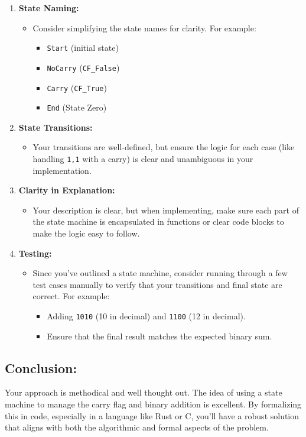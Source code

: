 \documentclass{article}
\begin{document}
\begin{enumerate}
    \item \textbf{State Naming:} 
    \begin{itemize}
        \item Consider simplifying the state names for clarity. For example:
        \begin{itemize}
            \item \texttt{Start} (initial state)
            \item \texttt{NoCarry} (\texttt{CF\_False})
            \item \texttt{Carry} (\texttt{CF\_True})
            \item \texttt{End} (State Zero)
        \end{itemize}
    \end{itemize}
    
    \item \textbf{State Transitions:} 
    \begin{itemize}
        \item Your transitions are well-defined, but ensure the logic for each case (like handling \texttt{1,1} with a carry) is clear and unambiguous in your implementation.
    \end{itemize}
    
    \item \textbf{Clarity in Explanation:} 
    \begin{itemize}
        \item Your description is clear, but when implementing, make sure each part of the state machine is encapsulated in functions or clear code blocks to make the logic easy to follow.
    \end{itemize}
    
    \item \textbf{Testing:} 
    \begin{itemize}
        \item Since you've outlined a state machine, consider running through a few test cases manually to verify that your transitions and final state are correct. For example:
        \begin{itemize}
            \item Adding \texttt{1010} (10 in decimal) and \texttt{1100} (12 in decimal).
            \item Ensure that the final result matches the expected binary sum.
        \end{itemize}
    \end{itemize}
\end{enumerate}

\subsection*{Conclusion:}

Your approach is methodical and well thought out. The idea of using a state machine to manage the carry flag and binary addition is excellent. By formalizing this in code, especially in a language like Rust or C, you’ll have a robust solution that aligns with both the algorithmic and formal aspects of the problem.
\end{document}
